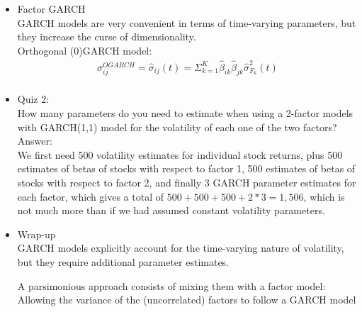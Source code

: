 \documentclass{maths}
\begin{document}
\begin{itemize}
\item Factor GARCH\\
GARCH models are very convenient in terms of time-varying parameters, but they increase the curse of dimensionality.\\

Orthogonal (0)GARCH model:
\begin{align*}
\sigma_{ij}^{OGARCH} = \hat{\sigma}_{ij}(t)=\Sigma_{k=1}^K \hat{\beta}_{ik}\hat{\beta}_{jk} \hat{\sigma}_{F_k}^2(t)\\
\end{align*}

 
\item Quiz 2:\\
How many parameters do you need to estimate when using a 2-factor models with GARCH(1,1) model for the volatility of each one of the two factors?\\

Answer:\\
We first need 500 volatility estimates for individual stock returns, plus 500 estimates of betas of stocks with respect to factor 1, 500 estimates of betas of stocks with respect to factor 2, and finally 3 GARCH parameter estimates for each factor, which gives a total of $500+500+500+2*3=1,506$, which is not much more than if we had assumed constant volatility parameters.\\

\item Wrap-up\\
GARCH models explicitly account for the time-varying nature of volatility, but they require additional parameter estimates.

A parsimonious approach consists of mixing them with a factor model:\\
Allowing the variance of the (uncorrelated) factors to follow a GARCH model
    
\end{itemize}
\end{document}
